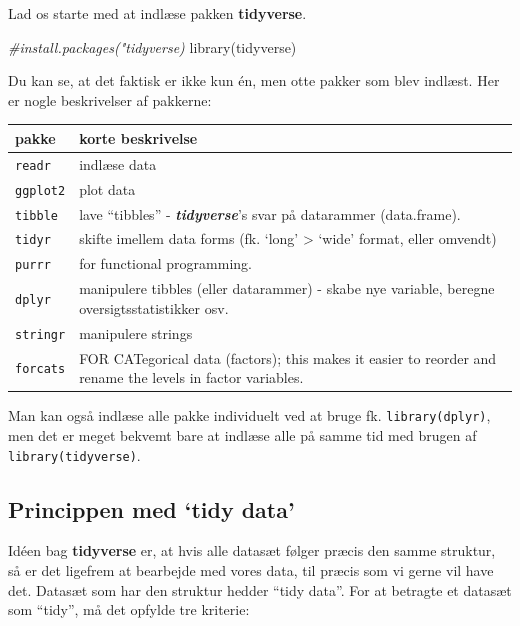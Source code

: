\documentclass[
]{book}
\newenvironment{Shaded}{\begin{snugshade}}{\end{snugshade}}
\newcommand{\CommentTok}[1]{\textcolor[rgb]{0.56,0.35,0.01}{\textit{#1}}}
\newcommand{\FunctionTok}[1]{\textcolor[rgb]{0.00,0.00,0.00}{#1}}
\newcommand{\NormalTok}[1]{#1}
\begin{document}
Lad os starte med at indlæse pakken \textbf{tidyverse}.

\begin{Shaded}
\begin{Highlighting}[]
\CommentTok{\#install.packages("tidyverse)}
\FunctionTok{library}\NormalTok{(tidyverse)}
\end{Highlighting}
\end{Shaded}

Du kan se, at det faktisk er ikke kun én, men otte pakker som blev indlæst. Her er nogle beskrivelser af pakkerne:

\begin{longtable}[]{@{}
  >{\raggedright\arraybackslash}p{}
  >{\raggedright\arraybackslash}p{}@{}}
\toprule
pakke & korte beskrivelse \\
\midrule
\endhead
\texttt{readr} & indlæse data \\
\texttt{ggplot2} & plot data \\
\texttt{tibble} & lave ``tibbles'' - \textbf{\emph{tidyverse}}'s svar på datarammer (data.frame). \\
\texttt{tidyr} & skifte imellem data forms (fk. `long' \textgreater{} `wide' format, eller omvendt) \\
\texttt{purrr} & for functional programming. \\
\texttt{dplyr} & manipulere tibbles (eller datarammer) - skabe nye variable, beregne oversigtsstatistikker osv. \\
\texttt{stringr} & manipulere strings \\
\texttt{forcats} & FOR CATegorical data (factors); this makes it easier to reorder and rename the levels in factor variables. \\
\bottomrule
\end{longtable}

Man kan også indlæse alle pakke individuelt ved at bruge fk. \texttt{library(dplyr)}, men det er meget bekvemt bare at indlæse alle på samme tid med brugen af \texttt{library(tidyverse)}.

\hypertarget{princippen-med-tidy-data}{%
\subsection{Princippen med `tidy data'}\label{princippen-med-tidy-data}}

Idéen bag \textbf{tidyverse} er, at hvis alle datasæt følger præcis den samme struktur, så er det ligefrem at bearbejde med vores data, til præcis som vi gerne vil have det. Datasæt som har den struktur hedder ``tidy data''. For at betragte et datasæt som ``tidy'', må det opfylde tre kriterie:
\end{document}

